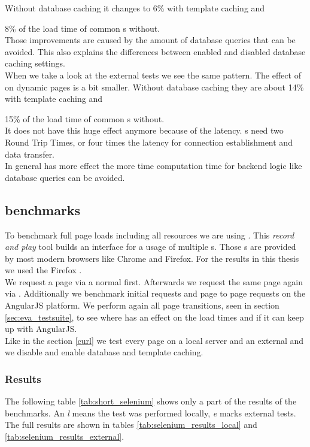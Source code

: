 Without database caching it changes to 6\% with template caching and {8\% of the load time of common \httpRequest{}s without.
\\
Those improvements are caused by the amount of database queries that can be avoided.
This also explains the differences between enabled and disabled database caching settings.
\\
When we take a look at the external tests we see the same pattern.
The effect of \lare{} on dynamic pages is a bit smaller.
Without database caching they are about 14\% with template caching and {15\% of the load time of common \httpRequest{}s without.
\\
It does not have this huge effect anymore because of the latency.
\httpRequest{}s need two Round Trip Times, or four times the latency for connection establishment and data transfer.
\\
In general \lare{} has more effect the more time computation time for backend logic like database queries can be avoided.

\subsection{\selenium{} benchmarks\label{selenium}}

To benchmark full page loads including all resources we are using \selenium{}.
This \emph{record and play} tool builds an interface for a usage of multiple \webdriver{}s.
Those \webdriver{}s are provided by most modern browsers like Chrome and Firefox.
For the results in this thesis we used the Firefox \webdriver{}.
\\
We request a page via a normal \httpRequest{} first.
Afterwards we request the same page again via \lare{}.
Additionally we benchmark initial requests and page to page requests on the AngularJS platform.
We perform again all page transitions, seen in section \ref{sec:eva_testsuite}, to see where \lare{} has an effect on the load times and if it can keep up with AngularJS.
\\
Like in the section \ref{curl} we test every page on a local server and an external \webServer{} and we disable and enable database and template caching.

\subsubsection{Results\label{selenium:results}}
The following table \ref{tab:short_selenium} shows only a part of the results of the \selenium{} benchmarks. 
An \emph{l} means the test was performed locally, \emph{e} marks external tests.
The full results are shown in tables \ref{tab:selenium_results_local} and \ref{tab:selenium_results_external}.

}}
